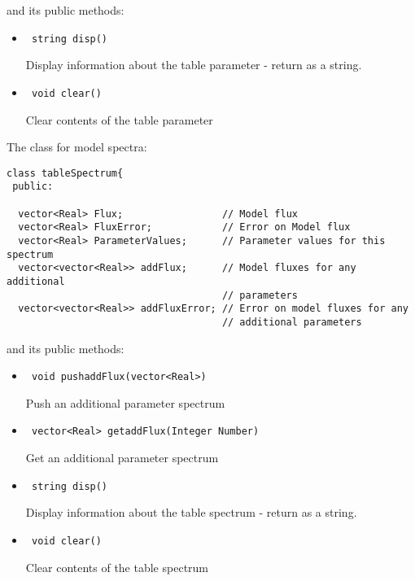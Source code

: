\documentclass[11pt]{book}
\begin{document}
and its public methods:

\begin{itemize}

\item    \begin{verbatim} string disp() \end{verbatim}

           Display information about the table parameter - return as a string.

\item    \begin{verbatim} void clear() \end{verbatim}

           Clear contents of the table parameter

\end{itemize}

The class for model spectra:

\begin{verbatim}
class tableSpectrum{
 public:

  vector<Real> Flux;                 // Model flux
  vector<Real> FluxError;            // Error on Model flux
  vector<Real> ParameterValues;      // Parameter values for this spectrum
  vector<vector<Real>> addFlux;      // Model fluxes for any additional
                                     // parameters
  vector<vector<Real>> addFluxError; // Error on model fluxes for any 
                                     // additional parameters
\end{verbatim}

and its public methods:

\begin{itemize}

\item    \begin{verbatim} void pushaddFlux(vector<Real>) \end{verbatim}
            
            Push an additional parameter spectrum

\item    \begin{verbatim} vector<Real> getaddFlux(Integer Number) \end{verbatim}
            
            Get an additional parameter spectrum

\item    \begin{verbatim} string disp() \end{verbatim}

            Display information about the table spectrum - return as a string.

\item    \begin{verbatim} void clear() \end{verbatim}

            Clear contents of the table spectrum

\end{itemize}
\end{document}
